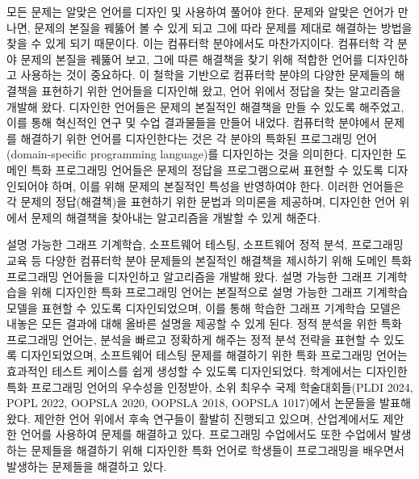 \documentclass[11pt]{article}
\begin{document}
\begin{spacing}{1.145}
모든 문제는 알맞은 언어를 디자인 및 사용하여 풀어야 한다.
%
문제와 알맞은 언어가 만나면, 문제의 본질을 꿰뚫어 볼 수 있게 되고 그에 따라 문제를 제대로 해결하는 방법을 찾을 수 있게 되기 때문이다.
%
이는 컴퓨터학 분야에서도 마찬가지이다.
%
컴퓨터학 각 분야 문제의 본질을 꿰뚫어 보고, 그에 따른 해결책을 찾기 위해 적합한 언어를 디자인하고 사용하는 것이 중요하다.
%
이 철학을 기반으로 컴퓨터학 분야의 다양한 문제들의 해결책을 표현하기 위한 언어들을 디자인해 왔고, 언어 위에서 정답을 찾는 알고리즘을 개발해 왔다.
%
디자인한 언어들은 문제의 본질적인 해결책을 만들 수 있도록 해주었고, 이를 통해 혁신적인 연구 및 수업 결과물들을 만들어 내었다.
%
컴퓨터학 분야에서 문제를 해결하기 위한 언어를 디자인한다는 것은 각 분야의 특화된 프로그래밍 언어(domain-specific programming language)를 디자인하는 것을 의미한다.
%
디자인한 도메인 특화 프로그래밍 언어들은 문제의 정답을 프로그램으로써 표현할 수 있도록 디자인되어야 하며, 이를 위해 문제의 본질적인 특성을 반영하여야 한다.
%
이러한 언어들은 각 문제의 정답(해결책)을 표현하기 위한 문법과 의미론을 제공하며, 디자인한 언어 위에서 문제의 해결책을 찾아내는 알고리즘을 개발할 수 있게 해준다.
    


설명 가능한 그래프 기계학습, 소프트웨어 테스팅, 소프트웨어 정적 분석, 프로그래밍 교육 등 다양한 컴퓨터학 분야 문제들의 본질적인 해결책을 제시하기 위해 도메인 특화 프로그래밍 언어들을 디자인하고 알고리즘을 개발해 왔다.
%
설명 가능한 그래프 기계학습을 위해 디자인한 특화 프로그래밍 언어는 본질적으로 설명 가능한 그래프 기계학습 모델을 표현할 수 있도록 디자인되었으며, 이를 통해 학습한 그래프 기계학습 모델은 내놓은 모든 결과에 대해 올바른 설명을 제공할 수 있게 된다.
%
정적 분석을 위한 특화 프로그래밍 언어는, 분석을 빠르고 정확하게 해주는 정적 분석 전략을 표현할 수 있도록 디자인되었으며, 소프트웨어 테스팅 문제를 해결하기 위한 특화 프로그래밍 언어는 효과적인 테스트 케이스를 쉽게 생성할 수 있도록 디자인되었다.
%
학계에서는 디자인한 특화 프로그래밍 언어의 우수성을 인정받아, 소위 최우수 국제 학술대회들(PLDI 2024, POPL 2022, OOPSLA 2020, OOPSLA 2018, OOPSLA 1017)에서 논문들을 발표해 왔다.
%
제안한 언어 위에서 후속 연구들이 활발히 진행되고 있으며, 산업계에서도 제안한 언어를 사용하여 문제를 해결하고 있다.
%
프로그래밍 수업에서도 또한 수업에서 발생하는 문제들을 해결하기 위해 디자인한 특화 언어로 학생들이 프로그래밍을 배우면서 발생하는 문제들을 해결하고 있다.






\end{spacing}
\end{document}
